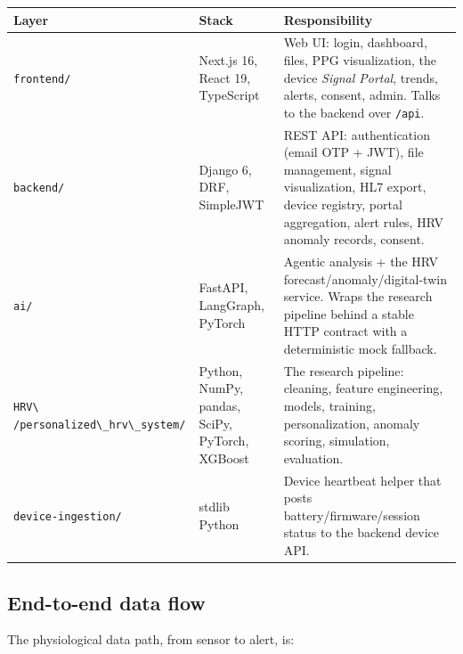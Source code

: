 \documentclass[11pt,a4paper]{article}
\newcommand{\code}[1]{\lstinline[basicstyle=\ttfamily\normalsize]!#1!}
\begin{document}
\begin{longtable}{@{}p{}p{}p{}@{}}
\toprule
\textbf{Layer} & \textbf{Stack} & \textbf{Responsibility} \\
\midrule
\endhead
\code{frontend/} & Next.js 16, React 19, TypeScript & Web UI: login, dashboard,
files, PPG visualization, the device \emph{Signal Portal}, trends, alerts,
consent, admin. Talks to the backend over \code{/api}. \\
\code{backend/} & Django 6, DRF, SimpleJWT & REST API: authentication (email
OTP + JWT), file management, signal visualization, HL7 export, device registry,
portal aggregation, alert rules, HRV anomaly records, consent. \\
\code{ai/} & FastAPI, LangGraph, PyTorch & Agentic analysis + the HRV
forecast/anomaly/digital-twin service. Wraps the research pipeline behind a
stable HTTP contract with a deterministic mock fallback. \\
\code{HRV\ /personalized\_hrv\_system/} & Python, NumPy, pandas, SciPy, PyTorch,
XGBoost & The research pipeline: cleaning, feature engineering, models,
training, personalization, anomaly scoring, simulation, evaluation. \\
\code{device-ingestion/} & stdlib Python & Device heartbeat helper that posts
battery/firmware/session status to the backend device API. \\
\bottomrule
\end{longtable}

\subsection{End-to-end data flow}

The physiological data path, from sensor to alert, is:
\end{document}
